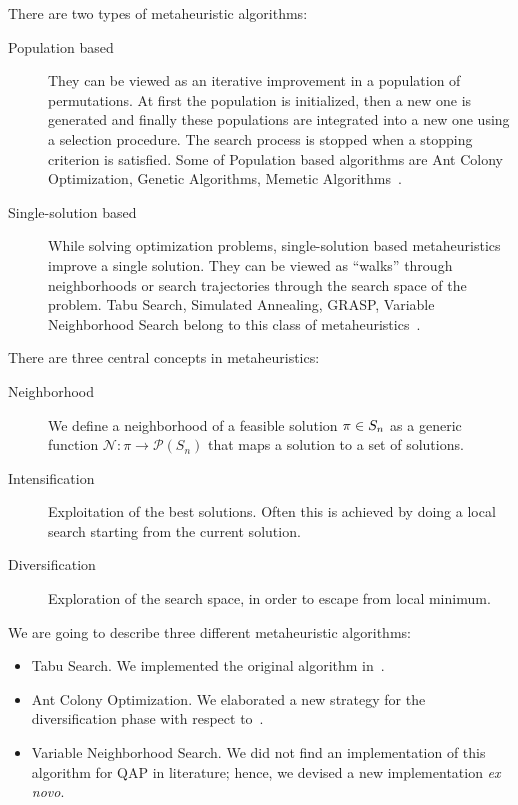 There are two types of metaheuristic algorithms:
\begin{description}
	\item[Population based] They can be viewed as an iterative improvement in a population of permutations. At first the population is initialized, then a new one is generated and finally these populations are integrated into a new one using a selection procedure. The search process is stopped when a stopping criterion is satisfied. Some of Population based algorithms are Ant Colony Optimization, Genetic Algorithms, Memetic Algorithms~\cite{Talbi_2009}. 
	\item[Single-solution based] While solving optimization problems, single-solution based metaheuristics improve a single solution. They can be viewed as “walks” through neighborhoods or search trajectories through the search space of the problem. Tabu Search, Simulated Annealing, GRASP, Variable Neighborhood Search belong to this class of metaheuristics~\cite{Talbi_2009}.
\end{description}

\noindent There are three central concepts in metaheuristics:
\begin{description}
	\item[Neighborhood] We define a neighborhood of a feasible solution $\pi \in S_n$ as a generic function $\mathcal N \colon \pi \to \mathcal P(S_n)$ that maps a solution to a set of solutions.
	\item[Intensification] Exploitation of the best solutions. Often this is achieved by doing a local search starting from the current solution.
	\item[Diversification]  Exploration of the search space, in order to escape from local minimum.
\end{description}

We are going to describe three different metaheuristic algorithms:
\begin{itemize}
	\item Tabu Search. We implemented the original algorithm in~\cite{Skorin_Kapov_1990}.
	\item Ant Colony Optimization. We elaborated a new strategy for the diversification phase with respect to~\cite{Gambardella1999}.
	\item Variable Neighborhood Search. We did not find an implementation of this algorithm for QAP in literature; hence, we devised a new implementation \textit{ex novo}. 
\end{itemize}


